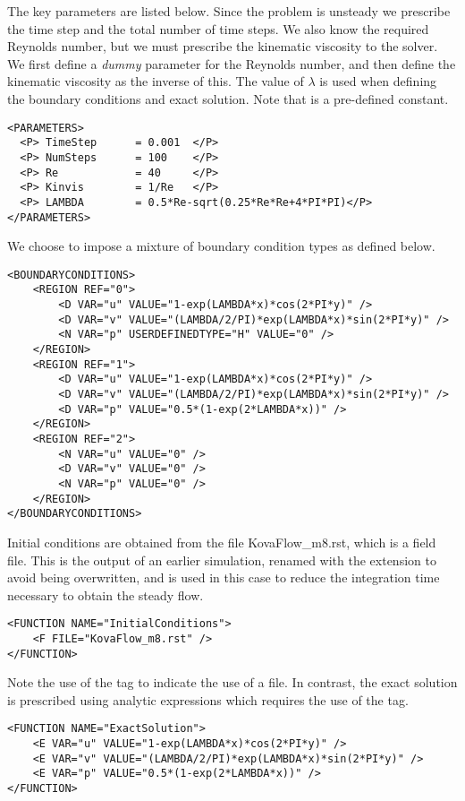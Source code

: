 The key parameters are listed below. Since the problem is unsteady we prescribe
the time step and the total number of time steps. We also know the required
Reynolds number, but we must prescribe the kinematic viscosity to the solver. We
first define a \emph{dummy} parameter for the Reynolds number, and then define
the kinematic viscosity as the inverse of this. The value of $\lambda$ is used
when defining the boundary conditions and exact solution. Note that 
is a pre-defined constant.

\begin{lstlisting}[style=XMLStyle]
<PARAMETERS>
  <P> TimeStep      = 0.001  </P>
  <P> NumSteps      = 100    </P>
  <P> Re            = 40     </P>
  <P> Kinvis        = 1/Re   </P>
  <P> LAMBDA        = 0.5*Re-sqrt(0.25*Re*Re+4*PI*PI)</P>
</PARAMETERS>
\end{lstlisting}

We choose to impose a mixture of boundary condition types as defined below.

\begin{lstlisting}[style=XMLStyle]
<BOUNDARYCONDITIONS>
    <REGION REF="0">
        <D VAR="u" VALUE="1-exp(LAMBDA*x)*cos(2*PI*y)" />
        <D VAR="v" VALUE="(LAMBDA/2/PI)*exp(LAMBDA*x)*sin(2*PI*y)" />
        <N VAR="p" USERDEFINEDTYPE="H" VALUE="0" />
    </REGION>
    <REGION REF="1">
        <D VAR="u" VALUE="1-exp(LAMBDA*x)*cos(2*PI*y)" />
        <D VAR="v" VALUE="(LAMBDA/2/PI)*exp(LAMBDA*x)*sin(2*PI*y)" />
        <D VAR="p" VALUE="0.5*(1-exp(2*LAMBDA*x))" />
    </REGION>
    <REGION REF="2">
        <N VAR="u" VALUE="0" />
        <D VAR="v" VALUE="0" />
        <N VAR="p" VALUE="0" />
    </REGION>
</BOUNDARYCONDITIONS>
\end{lstlisting}

Initial conditions are obtained from the file KovaFlow\_m8.rst, which is
a \nekpp field file. This is the output of an earlier simulation, renamed with
the extension  to avoid being overwritten, and is used in this case
to reduce the integration time necessary to obtain the steady flow.
\begin{lstlisting}[style=XMLStyle]
<FUNCTION NAME="InitialConditions">
    <F FILE="KovaFlow_m8.rst" />
</FUNCTION>
\end{lstlisting}
Note the use of the  tag to indicate the use of a file. In contrast,
the exact solution is prescribed using analytic expressions which requires the
use of the  tag.
\begin{lstlisting}[style=XMLStyle]
<FUNCTION NAME="ExactSolution">
    <E VAR="u" VALUE="1-exp(LAMBDA*x)*cos(2*PI*y)" />
    <E VAR="v" VALUE="(LAMBDA/2/PI)*exp(LAMBDA*x)*sin(2*PI*y)" />
    <E VAR="p" VALUE="0.5*(1-exp(2*LAMBDA*x))" />
</FUNCTION>
\end{lstlisting}

